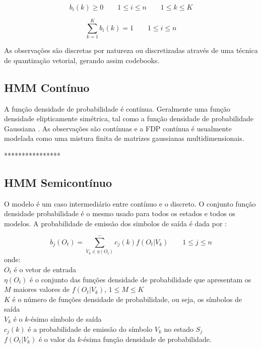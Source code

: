 $$
 \displaystyle  b_i (k) \geq 0 \qquad 1 \leq i \leq n  \qquad 1 \leq k \leq K
$$

\begin{equation}
\displaystyle \sum_{k=1}^K b_i (k) = 1 \qquad 1 \leq i \leq n 
\end{equation}

As observações são discretas por natureza ou discretizadas através de uma técnica de quantização vetorial, gerando assim codebooks.
 


\subsection{HMM Contínuo}

\quad A função densidade de probabilidade é contínua. Geralmente uma função densidade elipticamente simétrica, tal como a função densidade de probabilidade Gaussiana \cite{fundRecFala}.
 As observações são contínuas e a FDP contínua é  usualmente modelada como uma mistura finita de matrizes gaussianas multidimensionais.

****************


\subsection{HMM Semicontínuo}

\quad O modelo é um caso intermediário entre contínuo e o discreto. O conjunto função densidade probabilidade é o mesmo usado para todos os estados e todos os modelos. A probabilidade de emissão dos simbolos de saída é dada por :


\begin{equation}
\displaystyle b_j(O_t) =  \sum_{V_k \in \eta (O_t)}^-  c_j (k) f (O_t | V_k)   \qquad 1 \leq j \leq n 
\end{equation}
 onde:\\
$O_t$ é o vetor de entrada\\
$\eta(O_t)$ é o conjunto das funções densidade de probabilidade que apresentam os $M$ maiores valores de $f (O_t | V_k)$, $ 1 \leq M \leq K$\\
$K$ é o número de funções densidade de probabilidade, ou seja, os símbolos de saída\\
$V_k$ é o $k$-ésimo símbolo de saída\\
$ c_j (k)$ é a probabilidade de emissão do símbolo $V_k$ no estado $S_j$\\
$f (O_t | V_k)$ é o valor da $k$-ésima função densidade de probabilidade.



